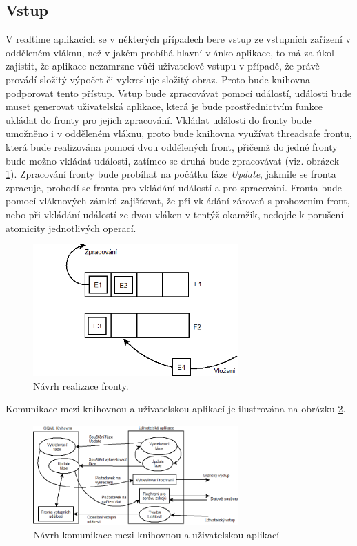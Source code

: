 \documentclass[11pt,twoside,a4paper]{book}
\begin{document}
\subsection {Vstup}
V realtime aplikacích se v některých případech bere vstup ze vstupních zařízení v odděleném vláknu, než v jakém probíhá hlavní vlánko aplikace, to má za úkol zajistit, že aplikace nezamrzne vůči uživatelově vstupu v případě, že právě provádí složitý výpočet či vykresluje složitý obraz. Proto bude knihovna podporovat tento přístup. Vstup bude zpracovávat pomocí událostí, události bude muset generovat uživatelská aplikace, která je bude prostřednictvím funkce ukládat do fronty pro jejich zpracování. Vkládat události do fronty bude umožněno i v odděleném vláknu, proto bude knihovna využívat threadsafe frontu, která bude realizována pomocí dvou oddělených front, přičemž do jedné fronty bude možno vkládat události, zatímco se druhá bude zpracovávat (viz. obrázek \ref{fig:que1N}). Zpracování fronty bude probíhat na počátku fáze \textit{Update}, jakmile se fronta zpracuje, prohodí se fronta pro vkládání událostí a pro zpracování. Fronta bude pomocí vláknových zámků zajišťovat, že při vkládání zároveň s prohozením front, nebo při vkládání událostí ze dvou vláken v tentýž okamžik, nedojde k porušení atomicity jednotlivých operací.\\
\begin{figure}[!ht]
\begin{center}
  \includegraphics[width=0.7\textwidth]{Diagram5}
\caption{{\label{fig:que1N}}Návrh realizace fronty.}
\end{center}
\end{figure}
Komunikace mezi knihovnou a uživatelskou aplikací je ilustrována na obrázku \ref{fig:lib1N}.
\begin{figure}[!ht]
\begin{center}
  \includegraphics[width=0.7\textwidth]{Diagram4}
\caption{{\label{fig:lib1N}} Návrh komunikace mezi knihovnou a uživatelskou aplikací}
\end{center}
\end{figure}
\end{document}
